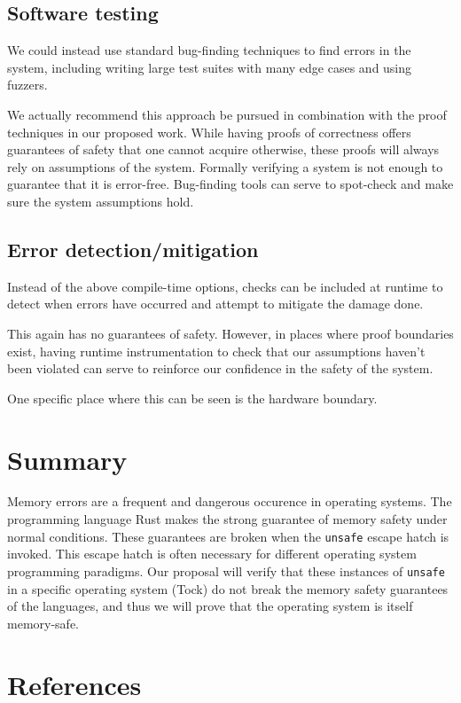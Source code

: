 \documentclass[12pt]{article}
\begin{document}
\subsection{Software testing}
We could instead use standard bug-finding techniques to find errors in the system, including writing large test suites with many edge cases and using fuzzers. 

We actually recommend this approach be pursued in combination with the proof techniques in our proposed work. While having proofs of correctness offers guarantees of safety that one cannot acquire otherwise, these proofs will always rely on assumptions of the system. Formally verifying a system is not enough to guarantee that it is error-free\cite{verified_bugs}. Bug-finding tools can serve to spot-check and make sure the system assumptions hold.
    
\subsection{Error detection/mitigation}
Instead of the above compile-time options, checks can be included at runtime to detect when errors have occurred and attempt to mitigate the damage done. 

This again has no guarantees of safety. However, in places where proof boundaries exist, having runtime instrumentation to check that our assumptions haven't been violated can serve to reinforce our confidence in the safety of the system.

One specific place where this can be seen is the hardware boundary. %

\section{Summary}
Memory errors are a frequent and dangerous occurence in operating systems. The programming language Rust makes the strong guarantee of memory safety under normal conditions. These guarantees are broken when the \texttt{unsafe} escape hatch is invoked. This escape hatch is often necessary for different operating system programming paradigms. Our proposal will verify that these instances of \texttt{unsafe} in a specific operating system (Tock) do not break the memory safety guarantees of the languages, and thus we will prove that the operating system is itself memory-safe.

\newpage
\section{References}


\end{document}
